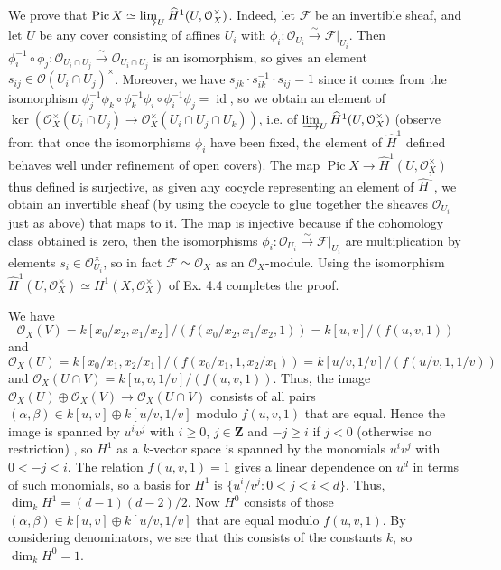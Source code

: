 \documentclass{report}
\newcommand{\F}{\mathcal{F}}
\renewcommand{\O}{\mathcal{O}}
\newcommand{\Z}{\mathbf{Z}}
\DeclareMathOperator{\id}{id}
\DeclareMathOperator{\Pic}{Pic}
\begin{document}
\bigskip
{}	We prove that $\Pic X\simeq \varinjlim_U\widehat{H}^1(U,\O_X^{\times})$.
Indeed, let $\F$ be an invertible sheaf, and let $U$ be any cover consisting of affines $U_i$ with $\phi_i:\O_{U_i}\xrightarrow{\sim}\F\big|_{U_i}$.
Then $\phi_i^{-1}\circ\phi_j:\O_{U_i\cap U_j}\xrightarrow{\sim}\O_{U_i\cap U_j}$ is an isomorphism, so gives an element $s_{ij}\in \O(U_i\cap U_j)^{\times}$.
Moreover, we have $s_{jk}\cdot s_{ik}^{-1}\cdot s_{ij}=1$ since it comes from the isomorphism $\phi_j^{-1}\phi_k\circ \phi_k^{-1}\phi_i\circ \phi_i^{-1}\phi_j=\id$,
so we obtain an element of $\ker \left(\O_X^{\times}(U_i\cap U_j)\rightarrow \O_X^{\times}(U_i\cap U_j\cap U_k)\right)$, i.e. of 
$\varinjlim_U \widehat{H}^1(U,\O_X^{\times})$ (observe from that once the isomorphisms $\phi_i$ have been fixed, the element of $\widehat{H}^1$
defined behaves well under refinement of open covers).  The map $\Pic X\rightarrow \widehat{H}^1(U,\O_X^{\times})$ thus defined
is surjective, as given any cocycle representing an element of $\widehat{H}^1$, we obtain an invertible sheaf (by using the cocycle to glue
together the sheaves $\O_{U_i}$ just as above) that maps to it.  The map is injective because if the cohomology class obtained is zero,
then the isomorphisms $\phi_i:\O_{U_i}\xrightarrow{\sim} \F\big|_{U_i}$ are multiplication by elements $s_i\in \O_{U_i}^{\times}$,
so in fact $\F\simeq \O_X$ as an $\O_X$-module.    Using the isomorphism $\widehat{H}^1(U,\O_X^{\times})\simeq H^1(X,\O_X^{\times})$
of Ex. 4.4 completes the proof.

\bigskip
{}	We have $$\O_X(V)=k[x_0/x_2,x_1/x_2]/(f(x_0/x_2,x_1/x_2,1))=k[u,v]/(f(u,v,1))$$ 
and $$\O_X(U)=k[x_0/x_1,x_2/x_1]/(f(x_0/x_1,1,x_2/x_1))=k[u/v,1/v]/(f(u/v,1,1/v))$$ and $\O_X(U\cap V)=k[u,v,1/v]/(f(u,v,1))$.
Thus, the image $\O_X(U)\oplus \O_X(V)\rightarrow \O_X(U\cap V)$ 
consists of all pairs
$(\alpha,\beta)\in k[u,v]\oplus k[u/v,1/v]$ modulo $f(u,v,1)$
that are equal.  Hence the image is spanned by $u^i v^j$ with $i\ge 0$, $j\in\Z$ and $-j\ge i$ if $j<0$ (otherwise no restriction) , so $H^1$ as a $k$-vector space
is spanned by the monomials $u^iv^j$ with $0<-j< i$.  The relation $f(u,v,1)=1$ gives a linear dependence on $u^d$ in terms
of such monomials, so a basis for $H^1$ is $\{u^i/v^j : 0< j < i < d\}$.  Thus, $\dim_k H^1=(d-1)(d-2)/2$.
Now $H^0$ consists of those $(\alpha,\beta)\in k[u,v]\oplus k[u/v,1/v]$ that are equal modulo $f(u,v,1)$.
By considering denominators, we see that this consists of the constants $k$, so $\dim_k H^0=1$.
\end{document}
